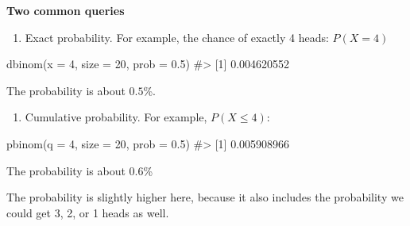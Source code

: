 \documentclass[
  letterpaper,
  DIV=11,
  numbers=noendperiod]{scrreprt}
\newenvironment{Shaded}{\begin{snugshade}}{\end{snugshade}}
\newcommand{\AttributeTok}[1]{\textcolor[rgb]{0.40,0.45,0.13}{#1}}
\newcommand{\CommentTok}[1]{\textcolor[rgb]{0.37,0.37,0.37}{#1}}
\newcommand{\DecValTok}[1]{\textcolor[rgb]{0.68,0.00,0.00}{#1}}
\newcommand{\FloatTok}[1]{\textcolor[rgb]{0.68,0.00,0.00}{#1}}
\newcommand{\FunctionTok}[1]{\textcolor[rgb]{0.28,0.35,0.67}{#1}}
\newcommand{\NormalTok}[1]{\textcolor[rgb]{0.00,0.23,0.31}{#1}}
\providecommand{\tightlist}{%
  \setlength{\itemsep}{0pt}\setlength{\parskip}{0pt}}
\begin{document}
\textbf{Two common queries}

\begin{enumerate}
\def\labelenumi{\arabic{enumi}.}
\tightlist
\item
  Exact probability. For example, the chance of exactly 4 heads:
  \(P(X=4)\)
\end{enumerate}

\begin{Shaded}
\begin{Highlighting}[]
\FunctionTok{dbinom}\NormalTok{(}\AttributeTok{x =} \DecValTok{4}\NormalTok{, }\AttributeTok{size =} \DecValTok{20}\NormalTok{, }\AttributeTok{prob =} \FloatTok{0.5}\NormalTok{)}
\CommentTok{\#\textgreater{} [1] 0.004620552}
\end{Highlighting}
\end{Shaded}

The probability is about \(0.5\)\%.

\begin{enumerate}
\def\labelenumi{\arabic{enumi}.}
\setcounter{enumi}{1}
\tightlist
\item
  Cumulative probability. For example, \(P(X \leq 4)\):
\end{enumerate}

\begin{Shaded}
\begin{Highlighting}[]
\FunctionTok{pbinom}\NormalTok{(}\AttributeTok{q =} \DecValTok{4}\NormalTok{, }\AttributeTok{size =} \DecValTok{20}\NormalTok{, }\AttributeTok{prob =} \FloatTok{0.5}\NormalTok{)}
\CommentTok{\#\textgreater{} [1] 0.005908966}
\end{Highlighting}
\end{Shaded}

The probability is about \(0.6\)\%

The probability is slightly higher here, because it also includes the
probability we could get 3, 2, or 1 heads as well.
\end{document}
